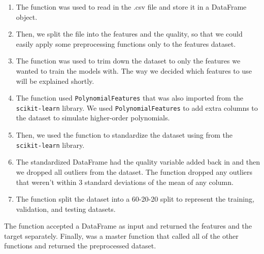 \begin{enumerate}
    \item The  function was used to read in the .csv file and store it in a DataFrame object.
    \item Then, we split the file into the features and the quality, so that we could easily apply some preprocessing functions only to the features dataset.
    \item The  function was used to trim down the dataset to only the features we wanted to train the models with. The way we decided which features to use will be explained shortly.
    \item The  function used \texttt{PolynomialFeatures} that was also imported from the \texttt{scikit-learn} library. We used \texttt{PolynomialFeatures} to add extra columns to the dataset to simulate higher-order polynomials.
    \item Then, we used the  function to standardize the dataset using  from the \texttt{scikit-learn} library.
    \item The standardized DataFrame had the quality variable added back in and then we dropped all outliers from the dataset. The  function dropped any outliers that weren't within $3$ standard deviations of the mean of any column.
    \item The  function split the dataset into a 60-20-20 split to represent the training, validation, and testing datasets.
\end{enumerate}      
The  function accepted a DataFrame as input and returned the features and the target separately. Finally,  was a master function that called all of the other functions and returned the preprocessed dataset.\\


